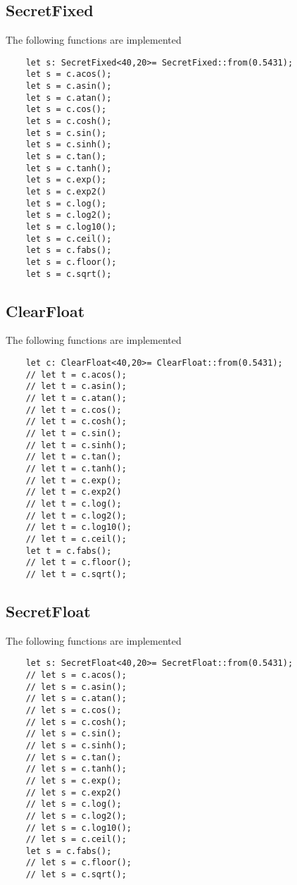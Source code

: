 \subsection{SecretFixed}
The following functions are implemented
\begin{lstlisting}
    let s: SecretFixed<40,20>= SecretFixed::from(0.5431);
    let s = c.acos();
    let s = c.asin();
    let s = c.atan();
    let s = c.cos();
    let s = c.cosh();
    let s = c.sin();
    let s = c.sinh();
    let s = c.tan();
    let s = c.tanh();
    let s = c.exp();
    let s = c.exp2()
    let s = c.log();
    let s = c.log2();
    let s = c.log10();
    let s = c.ceil();
    let s = c.fabs();
    let s = c.floor();
    let s = c.sqrt();
\end{lstlisting}


\subsection{ClearFloat}
The following functions are implemented
\begin{lstlisting}
    let c: ClearFloat<40,20>= ClearFloat::from(0.5431);
    // let t = c.acos();
    // let t = c.asin();
    // let t = c.atan();
    // let t = c.cos();
    // let t = c.cosh();
    // let t = c.sin();
    // let t = c.sinh();
    // let t = c.tan();
    // let t = c.tanh();
    // let t = c.exp();
    // let t = c.exp2()
    // let t = c.log();
    // let t = c.log2();
    // let t = c.log10();
    // let t = c.ceil();
    let t = c.fabs();
    // let t = c.floor();
    // let t = c.sqrt();
\end{lstlisting}

\subsection{SecretFloat}
The following functions are implemented
\begin{lstlisting}
    let s: SecretFloat<40,20>= SecretFloat::from(0.5431);
    // let s = c.acos();
    // let s = c.asin();
    // let s = c.atan();
    // let s = c.cos();
    // let s = c.cosh();
    // let s = c.sin();
    // let s = c.sinh();
    // let s = c.tan();
    // let s = c.tanh();
    // let s = c.exp();
    // let s = c.exp2()
    // let s = c.log();
    // let s = c.log2();
    // let s = c.log10();
    // let s = c.ceil();
    let s = c.fabs();
    // let s = c.floor();
    // let s = c.sqrt();
\end{lstlisting}
